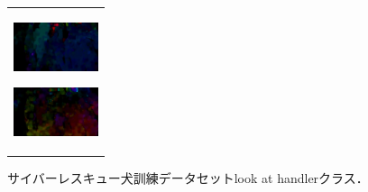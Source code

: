 \begin{figure}[H]
\begin{tabular}{l}
\begin{minipage}{0.165\hsize}
        \begin{center}
          \includegraphics[clip, width=2.5cm]{./Figures/optic_look4.eps}
          \hspace{0.1cm} { }
        \end{center}
      \end{minipage}
      \begin{minipage}{0.165\hsize}
        \begin{center}
          \includegraphics[clip, width=2.5cm]{./Figures/optic_look5.eps}
          \hspace{2.2cm} { }
        \end{center}
      \end{minipage}
    \end{tabular}
    \caption{サイバーレスキュー犬訓練データセットlook at handlerクラス．}
    \label{lookathandler}
\end{figure}

